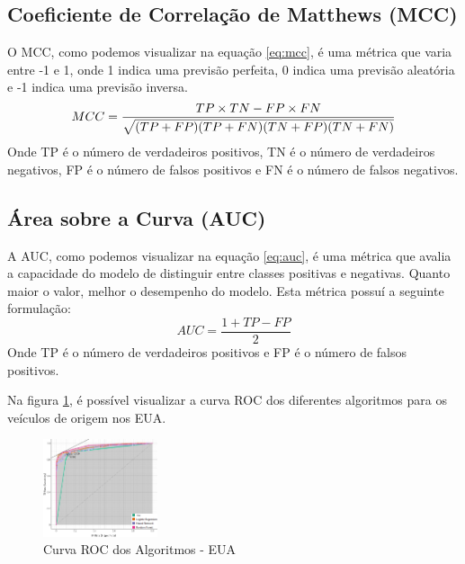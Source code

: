 \documentclass[conference]{IEEEtran}
\begin{document}
\subsection{Coeficiente de Correlação de Matthews (MCC)}
O MCC, como podemos visualizar na equação \ref{eq:mcc}, é uma métrica que varia entre -1 e 1, onde 1 indica uma previsão perfeita, 0 indica uma previsão aleatória e -1 indica uma previsão inversa.
\begin{equation}
	\footnotesize
	MCC = \frac{TP \times TN - FP \times FN}{\sqrt{(TP + FP)(TP + FN)(TN + FP)(TN + FN)}}
	\label{eq:mcc}
\end{equation}
Onde TP é o número de verdadeiros positivos, TN é o número de verdadeiros negativos, FP é o número de falsos positivos e FN é o número de falsos negativos.

\subsection{Área sobre a Curva (AUC)}
A AUC, como podemos visualizar na equação \ref{eq:auc}, é uma métrica que avalia a capacidade do modelo de distinguir entre classes positivas e negativas. Quanto maior o valor, melhor o desempenho do modelo.
Esta métrica possuí a seguinte formulação:
\begin{equation}
	AUC = \frac{1 + TP - FP}{2}
	\label{eq:auc}
\end{equation}
Onde TP é o número de verdadeiros positivos e FP é o número de falsos positivos.

Na figura \ref{fig:roc_eua}, é possível visualizar a curva ROC dos diferentes algoritmos para os veículos de origem nos EUA.
\begin{figure}[h]
	\centering
	\includegraphics[width=0.3\textwidth]{Resources/ROC_EUA.png}
	\caption{Curva ROC dos Algoritmos - EUA}
	\label{fig:roc_eua}
\end{figure}
\end{document}
